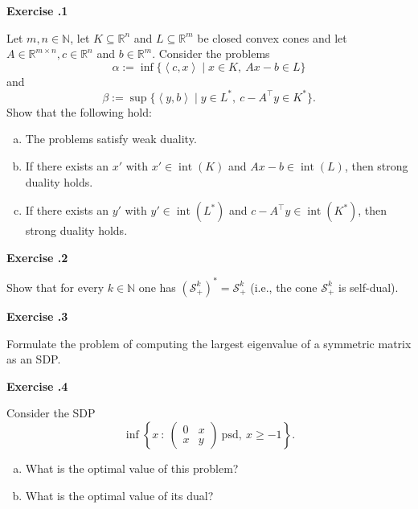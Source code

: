 \documentclass{imo_en}
\newcommand{\R}{\mathbb{R}}
\newcommand{\N}{\mathbb{N}}
\newcommand{\PSD}{\mathcal{S}}
\newcommand{\sprod}[2]{\left\langle #1 , #2 \right\rangle}
\newcommand{\intr}{\operatorname{int}}
\newcommand{\set}[1]{\{#1\}}
\begin{document}
\maketitle


{\large \textbf{Exercise \thesheetnumber .1}} \bigskip 

Let $m, n \in \N$, let $K \subseteq \R^n$ and $L \subseteq \R^m$ be closed convex cones and let $A \in \R^{m \times n}, c \in \R^n$ and $b \in \R^m$. Consider the problems
	\begin{equation*}
	\alpha := \inf \set{ \sprod{c}{x} \mid x \in K, \ A x - b \in L}
	\end{equation*}
	and
	\begin{equation*}
	\beta := \sup \set{ \sprod{y}{b} \mid y \in L^\ast, \ c - A^\top y \in K^\ast}.
	\end{equation*}
	Show that the following hold:
	\begin{enumerate}[(a)]
		\item The problems satisfy weak duality. 
		\item If there exists an $x'$ with $x' \in \intr(K)$ and $A x - b \in \intr(L)$, then strong duality holds.
		\item If there exists an $y'$ with $y' \in \intr(L^\ast)$ and $c - A^\top y \in \intr(K^\ast)$, then strong duality holds.
	\end{enumerate}

\bigskip


{\large \textbf{Exercise \thesheetnumber .2}} \bigskip

Show that for every $k \in \N$ one has $(\PSD_+^k)^\ast = \PSD_+^k$ (i.e., the cone $\PSD_+^k$ is self-dual).

\bigskip


{\large \textbf{Exercise \thesheetnumber .3}} \bigskip 

Formulate the problem of computing the largest eigenvalue of a symmetric matrix as an SDP.

\bigskip


{\large \textbf{Exercise \thesheetnumber .4}} \bigskip 

Consider the SDP
$$\inf \left\{ x~\colon~\begin{pmatrix} 0 & x \\ x & y \end{pmatrix} \ \text{psd},~x  \ge -1 \right\}. $$
	\begin{enumerate}[(a)]
		\item What is the optimal value of this problem? 
		\item What is the optimal value of its dual?
	\end{enumerate}


%
\end{document}
